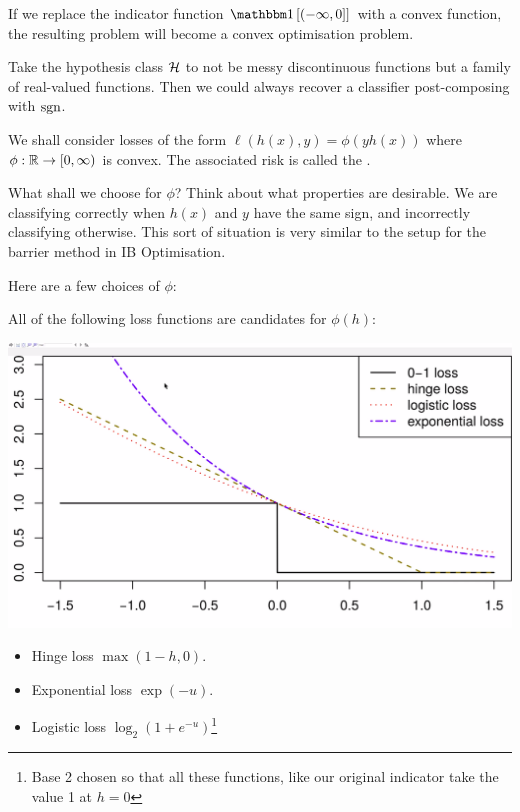 \documentclass[11pt]{scrartcl}
\begin{document}
If we replace the indicator function $\one{(-\infty, 0]}$ with a convex function, the resulting problem will become a convex optimisation problem.

Take the hypothesis class $\mathcal{H}$ to not be messy discontinuous functions but a family of real-valued functions. Then we could always recover a classifier post-composing with $\text{sgn}$.

We shall consider losses of the form $\ell (h(x), y) = \phi (yh(x))$ where $\phi : \mathbb R \rightarrow [0, \infty)$ is convex. The associated risk is called the . 

What shall we choose for $\phi$? Think about what properties are desirable. We are classifying correctly when $h(x)$ and $y$ have the same sign, and incorrectly classifying otherwise. This sort of situation is very similar to the setup for the barrier method in IB Optimisation.

Here are a few choices of $\phi$:

\begin{example}
All of the following loss functions are candidates for $\phi(h)$:

\begin{center}
\includegraphics[scale=0.25]{surrogates1.png}
\label{surrogates picture}
\end{center}

\begin{itemize}
    \item Hinge loss $\max (1-h, 0)$.
    \item Exponential loss $\exp(-u)$.
    \item Logistic loss $\log_2(1+e^{-u})$\footnote{Base 2 chosen so that all these functions, like our original indicator take the value 1 at $h=0$}
\end{itemize}
\label{surrogates pic}
\end{example}
\end{document}
